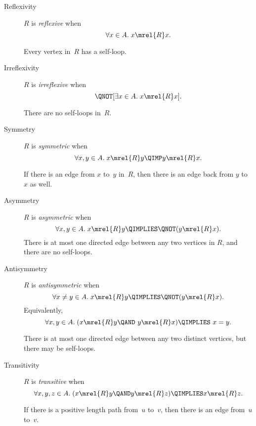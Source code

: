 \begin{description}

\item[Reflexivity]

$R$ is \emph{reflexive}%
when
\[
\forall x \in A. \; x \mrel{R} x.
\]


Every vertex in~$R$ has a self-loop.

\item[Irreflexivity]

$R$ is \emph{irreflexive}%
when
\[
\QNOT[ \exists x \in A. \; x \mrel{R} x].
\]


There are no self-loops in~$R$.

\item[Symmetry]

$R$ is \emph{symmetric}%
when
\[
\forall x, y \in A. \; x \mrel{R} y \QIMP y \mrel{R} x.
\]


If there is an edge from $x$ to~$y$ in~$R$, then there is an edge back
from $y$ to~$x$ as well.

\item[Asymmetry]
$R$ is \emph{asymmetric}%
when
\[
\forall x, y \in A. \; x \mrel{R} y \QIMPLIES \QNOT( y \mrel{R} x ).
\]
There is at most one directed edge between any two vertices in $R$,
and there are no self-loops.

\item[Antisymmetry]
$R$ is \emph{antisymmetric}%
when
\[
\forall x \neq y \in A. \; x \mrel{R} y \QIMPLIES \QNOT( y \mrel{R} x ).
\]
Equivalently,
\[
\forall x, y \in A. \; (x \mrel{R} y \QAND\ y \mrel{R} x ) \QIMPLIES\ x = y.
\]

There is at most one directed edge between any two distinct vertices,
but there may be self-loops.

\item[Transitivity]
$R$ is \emph{transitive}
when
\[
 \forall x, y, z \in A. \; (x \mrel{R} y \QAND y \mrel{R} z) \QIMPLIES x \mrel{R} z.
\]

If there is a positive length path from~$u$ to~$v$, then there is an edge from~$u$ to~$v$.


\end{description}
